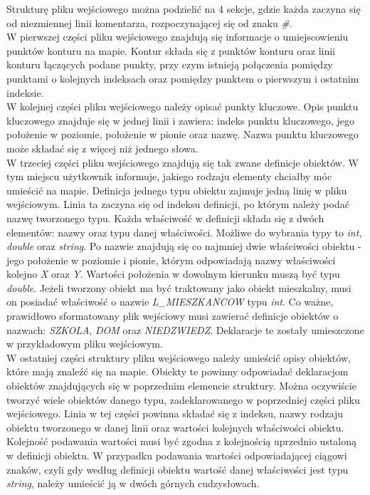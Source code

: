 \documentclass[a4paper,12pt]{article}
\newcommand\tab[1][0.6cm]{\hspace*{#1} }
\begin{document}
Strukturę pliku wejściowego można podzielić na 4 sekcje, gdzie każda zaczyna się od niezmiennej linii komentarza, rozpoczynającej się od znaku \textit{\#}.
\\\tab W pierwszej części pliku wejściowego znajdują się informacje o umiejscowieniu punktów konturu na mapie. Kontur składa się z punktów konturu oraz linii konturu łączących podane punkty, przy czym istnieją połączenia pomiędzy punktami o kolejnych indeksach oraz pomiędzy punktem o pierwszym i ostatnim indeksie.
\\\tab W kolejnej części pliku wejściowego należy opisać punkty kluczowe. Opis punktu kluczowego znajduje się w jednej linii i zawiera: indeks punktu kluczowego, jego położenie w poziomie, położenie w pionie oraz nazwę. Nazwa punktu kluczowego może składać się z więcej niż jednego słowa.
\\\tab W trzeciej części pliku wejściowego znajdują się tak zwane definicje obiektów. W tym miejscu użytkownik informuje, jakiego rodzaju elementy chciałby móc umieścić na mapie. Definicja jednego typu obiektu zajmuje jedną linię w pliku wejściowym. Linia ta zaczyna się od indeksu definicji, po którym należy podać nazwę tworzonego typu. Każda właściwość w definicji składa się z dwóch elementów: nazwy oraz typu danej właściwości. Możliwe do wybrania typy to \textit{int}, \textit{double} oraz \textit{string}. Po nazwie znajdują się co najmniej dwie właściwości obiektu - jego położenie w poziomie i pionie, którym odpowiadają nazwy właściwości kolejno \textit{X} oraz \textit{Y}. Wartości położenia w dowolnym kierunku muszą być typu \textit{double}. Jeżeli tworzony obiekt ma być traktowany jako obiekt mieszkalny, musi on posiadać właściwość o nazwie \textit{L\_MIESZKANCOW} typu \textit{int}. Co ważne, prawidłowo sformatowany plik wejściowy musi zawierać definicje obiektów o nazwach: \textit{SZKOLA}, \textit{DOM} oraz \textit{NIEDZWIEDZ}. Deklaracje te zostały umieszczone w przykładowym pliku wejściowym.
\\\tab W ostatniej części struktury pliku wejściowego należy umieścić opisy obiektów, które mają znaleźć się na mapie. Obiekty te powinny odpowiadać deklaracjom obiektów znajdujących się w poprzednim elemencie struktury. Można oczywiście tworzyć wiele obiektów danego typu, zadeklarowanego w poprzedniej części pliku wejściowego. Linia w tej części powinna składać się z indeksu, nazwy rodzaju obiektu tworzonego w danej linii oraz wartości kolejnych właściwości obiektu. Kolejność podawania wartości musi być zgodna z kolejnością uprzednio ustaloną w definicji obiektu. W przypadku podawania wartości odpowiadającej ciągowi znaków, czyli gdy według definicji obiektu wartość danej właściwości jest typu \textit{string}, należy umieścić ją w dwóch górnych cudzysłowach.
\end{document}
